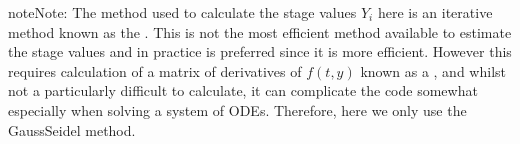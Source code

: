 \documentclass[letterpaper,10pt,english]{jupyterBook}
\begin{document}
\begin{sphinxadmonition}{note}{Note:}
\sphinxAtStartPar
The method used to calculate the stage values \(Y_i\) here is an iterative method known as the {\hyperref[\detokenize{7_Indirect_methods/7.2_Gauss_Seidel_method:gauss-seidel-method-section}]{}}. This is not the most efficient method available to estimate the stage values and in practice  is preferred since it is more efficient. However this requires calculation of a matrix of derivatives of \(f(t,y)\) known as a , and whilst not a particularly difficult to calculate, it can complicate the code somewhat especially when solving a system of ODEs. Therefore, here we only use the Gauss\sphinxhyphen{}Seidel method.
\end{sphinxadmonition}

\sphinxstepscope
\end{document}
